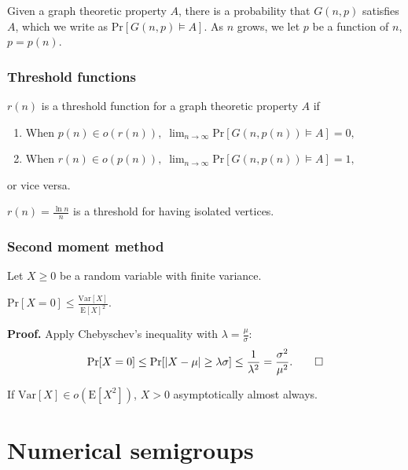\documentclass{beamer}
\def\Pr{\ensuremath{\mathrm{Pr}}}
\def\Var{\ensuremath{\mathrm{Var}}}
\def\EE{\ensuremath{\mathrm{E}}}
\begin{document}

\begin{frame}
    Given a graph theoretic property $A$, there is a probability that $G(n, p)$ satisfies $A$, which we write as $\Pr[G(n, p) \vDash A]$. As $n$ grows, we let $p$ be a function of $n$, $p = p(n)$. \par
\frametitle{Threshold functions}
\begin{definition}\label{def:probmet:threshold}
    $r(n)$ is a threshold function for a graph theoretic property $A$ if 
    \begin{enumerate}
        \item When \(p(n) \in o(r(n)), \; \lim_{n \to \infty} \Pr[G(n, p(n)) \vDash A] = 0,\)
        \item When \(r(n) \in o(p(n)), \;  \lim_{n \to \infty} \Pr[G(n, p(n)) \vDash A] = 1,\) 
    \end{enumerate}
    or vice versa.
\end{definition}
\begin{example}
    $\displaystyle{r(n) = \frac{\ln n}{n}}$ is a threshold for having isolated vertices. 
\end{example}
\end{frame}



\begin{frame}
    \frametitle{Second moment method}
    Let $X \geq 0$ be a random variable with finite variance. 
    \begin{theorem}\label{thm:probmet:secondmoment:1}
        \(\Pr[X = 0] \leq \frac{\Var[X]}{\EE[X]^2}.\)
    \end{theorem}
    \textbf{Proof.} Apply Chebyschev's inequality with $\lambda = \frac{\mu}{\sigma}$:
    \[\Pr[X = 0] \leq \Pr[|X - \mu| \geq \lambda \sigma] \leq \frac{1}{\lambda^2} = \frac{\sigma^2}{\mu^2}. \qed \]
    \begin{corollary}\label{cor:probmet:secondmoment:1}
        If $\Var[X] \in o(\EE[X^2])$, $X > 0$ asymptotically almost always. 
    \end{corollary}
    
\end{frame}


\section{Numerical semigroups}
\end{document}
